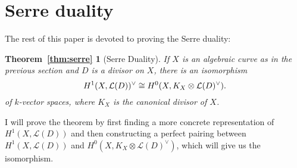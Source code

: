 \section{Serre duality}
The rest of this paper is devoted to proving the Serre duality:
\newtheorem*{thm:serre}{Theorem~\ref{thm:serre}}
\begin{thm:serre}[Serre Duality]
  If $X$ is an algebraic curve as in the previous section
  and $D$ is a divisor on $X$, there is an isomorphism
  \[
    H^1(X,\mathcal{L}(D))^{\vee}\cong H^{0}(X, K_{X}
    \otimes \mathcal{L}(D)^{\vee}).
  \]
  of $k$-vector spaces, where $K_{X}$ is the canonical divisor of $X$.
\end{thm:serre}
I will prove the theorem by first finding a more concrete representation of
$H^{1}(X,\mathcal{L}(D))$ and then constructing a perfect pairing between
$H^{1}(X,\mathcal{L}(D))$ and $H^{0}(X,K_{X}\otimes\mathcal{L}(D)^{\vee})$,
which will give us the isomorphism.

